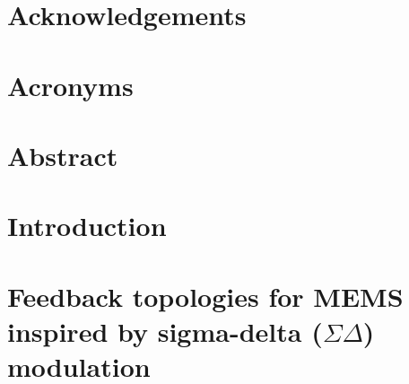\documentclass[11pt,english,british]{report}
\begin{document}
\tableofcontents{}

\pagebreak{}




\pagestyle{plain}


\chapter*{Acknowledgements } 


\chapter*{Acronyms} 


\chapter*{Abstract} 


\clearpage


\setcounter{page}{1} 
	
\pagestyle{fancy}

\fancyhead{} 

\fancyhead[LE,RO]{\slshape \nouppercase{\rightmark}} 

\fancyhead[LO,RE]{\slshape \nouppercase{\leftmark}}

\setcounter{chapter}{0}

\chapter{Introduction}\label{chap:1}


\setcounter{chapter}{1}

\chapter{Feedback topologies for MEMS inspired by sigma-delta ($\Sigma\Delta$) modulation}\label{chap:2}
\end{document}
